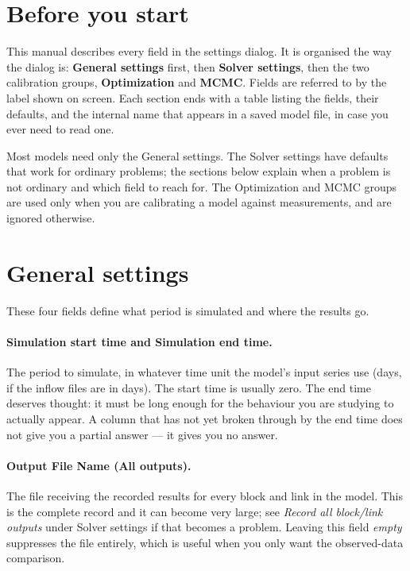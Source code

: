 \section{Before you start}

This manual describes every field in the settings dialog. It is organised the
way the dialog is: \textbf{General settings} first, then \textbf{Solver
settings}, then the two calibration groups, \textbf{Optimization} and
\textbf{MCMC}. Fields are referred to by the label shown on screen. Each
section ends with a table listing the fields, their defaults, and the internal
name that appears in a saved model file, in case you ever need to read one.

Most models need only the General settings. The Solver settings have defaults
that work for ordinary problems; the sections below explain when a problem is
not ordinary and which field to reach for. The Optimization and MCMC groups are
used only when you are calibrating a model against measurements, and are
ignored otherwise.

\section{General settings}

These four fields define what period is simulated and where the results go.

\paragraph{Simulation start time and Simulation end time.}
The period to simulate, in whatever time unit the model's input series use
(days, if the inflow files are in days). The start time is usually zero. The
end time deserves thought: it must be long enough for the behaviour you are
studying to actually appear. A column that has not yet broken through by the
end time does not give you a partial answer --- it gives you no answer.

\paragraph{Output File Name (All outputs).}
The file receiving the recorded results for every block and link in the model.
This is the complete record and it can become very large; see \emph{Record all
block/link outputs} under Solver settings if that becomes a problem. Leaving
this field \emph{empty} suppresses the file entirely, which is useful when you
only want the observed-data comparison.

